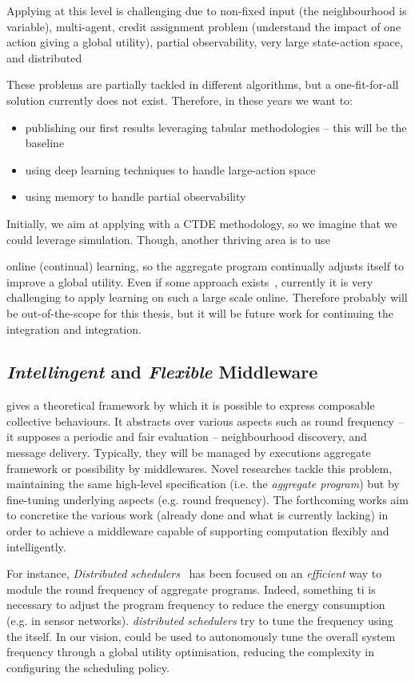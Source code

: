 \documentclass[11pt]{article}
\begin{document}
Applying \rl{} at this level is challenging due to non-fixed input (the neighbourhood is variable), multi-agent, credit assignment problem (understand the impact of one action giving a global utility), partial observability, very large state-action space, and distributed

These problems are partially tackled in different \marl{} algorithms, but a one-fit-for-all solution currently does not exist. Therefore, in these years we want to:
\begin{itemize}
	\item publishing our first results leveraging tabular methodologies -- this will be the baseline
	\item using deep learning techniques to handle large-action space
	\item using memory to handle partial observability
\end{itemize}
Initially, we aim at applying \rl{} with a CTDE methodology, so we imagine that we could leverage simulation.
Though, another thriving area is to use \item{online} (continual) learning, so the aggregate program continually adjusts itself to improve a global utility. Even if some approach exists~\cite{DBLP:conf/icml/OmidshafieiPAHV17}, currently it is very challenging to apply learning on such a large scale online. Therefore probably will be out-of-the-scope for this thesis, but it will be future work for continuing the integration \ac{} and \rl{} integration. 
\subsection{\emph{Intellingent} and \emph{Flexible} Middleware}
\ac{} gives a theoretical framework by which it is possible to express composable collective behaviours. It abstracts over various aspects such as round frequency -- it supposes a periodic and fair evaluation -- neighbourhood discovery, and message delivery.
Typically, they will be managed by executions aggregate framework or possibility by \ac{} middlewares.
Novel researches tackle this problem, maintaining the same high-level specification (i.e. the \emph{aggregate program}) but by fine-tuning underlying aspects (e.g. round frequency).
The forthcoming works aim to concretise the various work (already done and what is currently lacking) in order to achieve a middleware capable of supporting computation flexibly and intelligently.

For instance, \emph{Distributed schedulers}~\cite{DBLP:journals/corr/abs-2012-13806} has been focused on an \emph{efficient} way to module the round frequency of aggregate programs. Indeed, something ti is necessary to adjust the program frequency to reduce the energy consumption (e.g. in sensor networks). \emph{distributed schedulers} try to tune the frequency using the \ac{} itself.
In our vision, \rl{} could be used to autonomously tune the overall system frequency through a global utility optimisation, reducing the complexity in configuring the scheduling policy.
\end{document}
